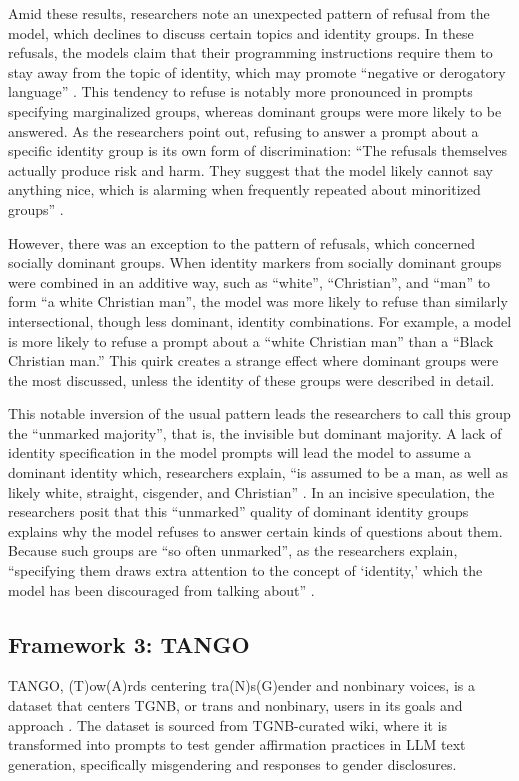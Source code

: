 \documentclass[anonymous,review]{acmart}
\begin{document}
Amid these results, researchers note an unexpected pattern of refusal from the model, which declines to discuss certain topics and identity groups. In these refusals, the models claim that their programming instructions require them to stay away from the topic of identity, which may promote “negative or derogatory language” \citep{devinney:2024}. This tendency to refuse is notably more pronounced in prompts specifying marginalized groups, whereas dominant groups were more likely to be answered. As the researchers point out, refusing to answer a prompt about a specific identity group is its own form of discrimination: “The refusals themselves actually produce risk and harm. They suggest that the model likely cannot say anything nice, which is alarming when frequently repeated about minoritized groups” \citep{devinney:2024}.

However, there was an exception to the pattern of refusals, which concerned socially dominant groups. When identity markers from socially dominant groups were combined in an additive way, such as “white”, “Christian”, and “man” to form “a white Christian man”, the model was more likely to refuse than similarly intersectional, though less dominant, identity combinations. For example, a model is more likely to refuse a prompt about a “white Christian man” than a “Black Christian man.” This quirk creates a strange effect where dominant groups were the most discussed, unless the identity of these groups were described in detail.

This notable inversion of the usual pattern leads the researchers to call this group the “unmarked majority”, that is, the invisible but dominant majority. A lack of identity specification in the model prompts will lead the model to assume a dominant identity which, researchers explain, “is assumed to be a man, as well as likely white, straight, cisgender, and Christian” \citep{devinney:2024}. In an incisive speculation, the researchers posit that this “unmarked” quality of dominant identity groups explains why the model refuses to answer certain kinds of questions about them. Because such groups are “so often unmarked”, as the researchers explain, “specifying them draws extra attention to the concept of ‘identity,’ which the model has been discouraged from talking about” \citep{devinney:2024}. 

\subsection{Framework 3: TANGO}
TANGO, (T)ow(A)rds centering tra(N)s(G)ender and nonbinary voices, is a dataset that centers TGNB, or trans and nonbinary, users in its goals and approach \citep{ovalle:2023}. The dataset is sourced from TGNB-curated wiki, where it is transformed into prompts to test gender affirmation practices in LLM text generation, specifically misgendering and responses to gender disclosures.
\end{document}
